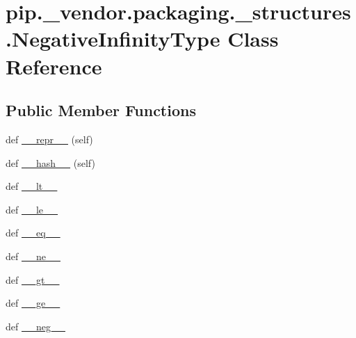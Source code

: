 \hypertarget{classpip_1_1__vendor_1_1packaging_1_1__structures_1_1NegativeInfinityType}{}\section{pip.\+\_\+vendor.\+packaging.\+\_\+structures.\+Negative\+Infinity\+Type Class Reference}
\label{classpip_1_1__vendor_1_1packaging_1_1__structures_1_1NegativeInfinityType}
\subsection*{Public Member Functions}
\begin{DoxyCompactItemize}
\item 
def \hyperlink{classpip_1_1__vendor_1_1packaging_1_1__structures_1_1NegativeInfinityType_a519cac59a9d1220dccb49bf879965031}{\+\_\+\+\_\+repr\+\_\+\+\_\+} (self)
\item 
def \hyperlink{classpip_1_1__vendor_1_1packaging_1_1__structures_1_1NegativeInfinityType_ab388418c5f4e441b543c2963343b8732}{\+\_\+\+\_\+hash\+\_\+\+\_\+} (self)
\item 
def \hyperlink{classpip_1_1__vendor_1_1packaging_1_1__structures_1_1NegativeInfinityType_a0825cfdab5aa9191479033a93d86cf8e}{\+\_\+\+\_\+lt\+\_\+\+\_\+}
\item 
def \hyperlink{classpip_1_1__vendor_1_1packaging_1_1__structures_1_1NegativeInfinityType_acf71dcc8cab621fd087a9f49fde08984}{\+\_\+\+\_\+le\+\_\+\+\_\+}
\item 
def \hyperlink{classpip_1_1__vendor_1_1packaging_1_1__structures_1_1NegativeInfinityType_aa64879fb00ada4512a6b2b0bdf30cb7b}{\+\_\+\+\_\+eq\+\_\+\+\_\+}
\item 
def \hyperlink{classpip_1_1__vendor_1_1packaging_1_1__structures_1_1NegativeInfinityType_a68238967f7e617bf737508c7b2bc169f}{\+\_\+\+\_\+ne\+\_\+\+\_\+}
\item 
def \hyperlink{classpip_1_1__vendor_1_1packaging_1_1__structures_1_1NegativeInfinityType_a252fc30c9f1336ff08206b09ae4d23b1}{\+\_\+\+\_\+gt\+\_\+\+\_\+}
\item 
def \hyperlink{classpip_1_1__vendor_1_1packaging_1_1__structures_1_1NegativeInfinityType_a78e64301d22d36abfe355c4ed0f80ed8}{\+\_\+\+\_\+ge\+\_\+\+\_\+}
\item 
def \hyperlink{classpip_1_1__vendor_1_1packaging_1_1__structures_1_1NegativeInfinityType_a6888170d98927174d558cc2eea91aef5}{\+\_\+\+\_\+neg\+\_\+\+\_\+}
\end{DoxyCompactItemize}


